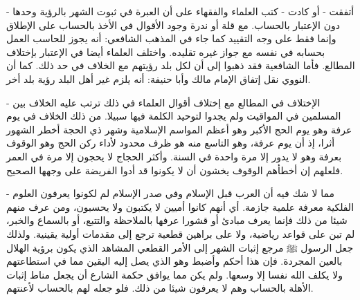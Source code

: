 - أتفقت - أو كادت - كتب العلماء والفقهاء على أن العبرة في ثبوت الشهر بالرؤية وحدها دون الإعتبار بالحساب. مع قلة أو ندرة وجود الأقوال في الأخذ بالحساب على الإطلاق وإنما فقط على وجه التقييد كما جاء في المذهب الشافعي: أنه يجوز للحاسب العمل بحسابه في نفسه مع جواز غيره تقليده. واختلف العلماء أيضا في الإعتبار بإختلاف المطالع. فأما الشافعية فقد ذهبوا إلى أن لكل بلد رؤيتهم مع الخلاف في حد ذلك. كما أن النووي نقل إتفاق الإمام مالك وأبا حنيفة: أنه يلزم غير أهل البلد رؤية بلد أخر.

- الإختلاف في المطالع مع إختلاف أقوال العلماء في ذلك ترتب عليه الخلاف بين المسلمين في المواقيت ولم يجدوا لتوحيد الكلمة فيها سبيلا. من ذلك الخلاف في يوم عرفة وهو يوم الحج الأكبر وهو أعظم المواسم الإسلامية وشهر ذي الحجة أخطر الشهور أثرا، إذ أن يوم عرفة، وهو التاسع منه هو ظرف محدود لأداء ركن الحج وهو الوقوف بعرفة وهو لا يدور إلا مرة واحدة في السنة. وأكثر الحجاج لا يحجون إلا مرة في العمر فلعلهم إن أخطأهم الوقوف يخشون أن لا يكونوا قد أدوا الفريضة على وجهها الصحيح.

- مما لا شك فيه أن العرب قبل الإسلام وفي صدر الإسلام لم لكونوا يعرفون العلوم الفلكية معرفة علمية جازمة. أي أنهم كانوا أميين لا يكتبون ولا يحسبون، ومن عرف منهم شيئا من ذلك فإنما يعرف مبادئ أو قشورا عرفها بالملاحظة والتتبع، أو بالسماع والخبر، لم تبن على قواعد رياضية، ولا على براهين قطعية ترجع إلى مقدمات أولية يقينية. ولذلك جعل الرسول ﷺ مرجع إثبات الشهر إلى الأمر القطعي المشاهد الذي يكون برؤية الهلال بالعين المجردة. فإن هذا أحكم وأضبط وهو الذي يصل إليه اليقين مما في استطاعتهم ولا يكلف الله نفسا إلا وسعها. ولم يكن مما يوافق حكمة الشارع أن يجعل مناط إثبات الأهلة بالحساب وهم لا يعرفون شيئا من ذلك. فلو جعله لهم بالحساب لأعنتهم.


